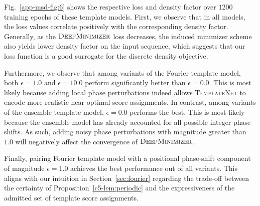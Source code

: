 Fig.~\ref{app-msd-fig:6} shows the respective loss and density factor over $1200$ training epochs of these template models. First, we observe that in all models, the loss values correlate positively with the corresponding density factor. Generally, as the $\textsc{DeepMinimizer}$ loss decreases, the induced minimizer scheme also yields lower density factor on the input sequence, which suggests that our loss function is a good surrogate for the discrete density objective. 

Furthermore, we observe that among variants of the Fourier template model, both $\epsilon=1.0$ and $\epsilon=10.0$ perform significantly better than $\epsilon=0.0$. This is most likely because adding local phase perturbations indeed allows \textsc{TemplateNet} to encode more realistic near-optimal score assignments. In contrast, among variants of the ensemble template model, $\epsilon=0.0$ performs the best. This is most likely because the ensemble model has already accounted for all possible integer phase-shifts. As such, adding noisy phase perturbations with magnitude greater than $1.0$ will negatively affect the convergence of $\textsc{DeepMinimizer}$.

Finally, pairing Fourier template model with a positional phase-shift component of magnitude $\epsilon=1.0$ achieves the best performance out of all variants. This aligns with our intuition in Section~\ref{sec:fourier} regarding the trade-off between the certainty of Proposition~\ref{c5-lem:periodic} and the expressiveness of the admitted set of template score assignments.


